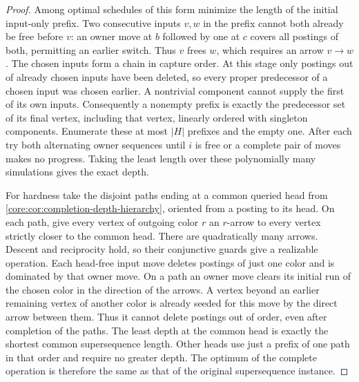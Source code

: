 \begin{proof}
Among optimal schedules of this form minimize the length of the
initial input-only prefix. Two consecutive inputs $v,w$ in the
prefix cannot both already be free before $v$: an owner move at
$b$ followed by one at $c$ covers all postings of both, permitting
an earlier switch. Thus $v$ frees $w$, which requires an arrow
$v\to w$. The chosen inputs form a chain in capture order. At this
stage only postings out of already chosen inputs have been deleted,
so every proper predecessor of a chosen input was chosen earlier.
A nontrivial component cannot supply the first of its own inputs.
Consequently a nonempty prefix is exactly the predecessor set of
its final vertex, including that vertex, linearly ordered with
singleton components. Enumerate these at most $|H|$ prefixes and the
empty one. After each try both alternating owner sequences until
$i$ is free or a complete pair of moves makes no progress. Taking
the least length over these polynomially many simulations gives
the exact depth.

For hardness take the disjoint paths ending at a common queried head
from \cref{core:cor:completion-depth-hierarchy}, oriented from a
posting to its head. On each path, give every vertex of outgoing color
$r$ an $r$-arrow to every vertex strictly closer to the common head.
There are quadratically many arrows. Descent and reciprocity hold,
so their conjunctive guards give a realizable operation. Each
head-free input move deletes postings of just one color and is
dominated by that owner move. On a path an owner move clears its
initial run of the chosen color in the direction of the arrows.
A vertex beyond an earlier remaining vertex of another color is
already seeded for this move by the direct arrow between them.
Thus it cannot delete postings out of order, even after completion
of the paths. The least depth at the common head is exactly the
shortest common supersequence length. Other heads use just a prefix
of one path in that order and require no greater depth. The optimum
of the complete operation is therefore the same as that of the
original supersequence instance.
\end{proof}

